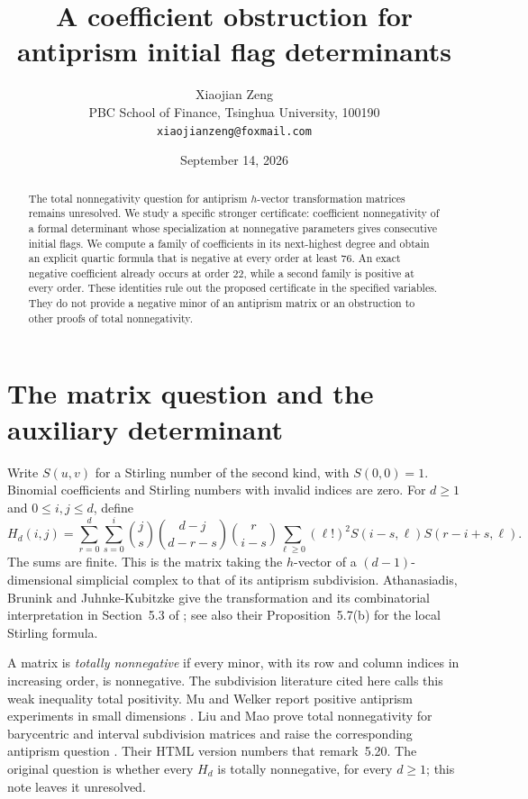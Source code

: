 \documentclass[11pt]{article}
\title{A coefficient obstruction for antiprism initial flag determinants}
\author{Xiaojian Zeng\\[3pt]
\small PBC School of Finance, Tsinghua University, 100190\\
\small\texttt{xiaojianzeng@foxmail.com}}
\date{September 14, 2026}
\begin{document}
\maketitle

\begin{abstract}
The total nonnegativity question for antiprism $h$-vector transformation
matrices remains unresolved. We study a specific stronger certificate:
coefficient nonnegativity of a formal determinant whose specialization at
nonnegative parameters gives consecutive initial flags. We compute a family of
coefficients in its next-highest degree and obtain an explicit quartic
formula that is negative at every order at least $76$. An exact negative
coefficient already occurs at order $22$, while a second family is positive
at every order. These identities rule out the proposed certificate in the
specified variables. They do not provide a negative minor of an antiprism
matrix or an obstruction to other proofs of total nonnegativity.
\end{abstract}

\section{The matrix question and the auxiliary determinant}

Write $S(u,v)$ for a Stirling number of the second kind, with $S(0,0)=1$.
Binomial coefficients and Stirling numbers with invalid indices are zero.
For $d\geq1$ and $0\leq i,j\leq d$, define
\begin{equation}\label{eq:H}
 H_d(i,j)=\sum_{r=0}^d\sum_{s=0}^i
 \binom{j}{s}\binom{d-j}{d-r-s}\binom{r}{i-s}
 \sum_{\ell\geq0}(\ell!)^2S(i-s,\ell)S(r-i+s,\ell).
\end{equation}
The sums are finite. This is the matrix taking the $h$-vector of a
$(d-1)$-dimensional simplicial complex to that of its antiprism subdivision.
Athanasiadis, Brunink and Juhnke-Kubitzke give the transformation and its
combinatorial interpretation in Section~5.3 of \cite{ABJ2022}; see also
their Proposition~5.7(b) for the local Stirling formula.

A matrix is \emph{totally nonnegative} if every minor, with its row and
column indices in increasing order, is nonnegative. The subdivision
literature cited here calls this weak inequality total positivity.
Mu and Welker report positive antiprism experiments in small dimensions
\cite[Section~2, final paragraph]{MW2026}.
Liu and Mao prove total nonnegativity for barycentric and interval
subdivision matrices and raise the corresponding antiprism question
\cite[Remark~5.8 in the PDF]{LM2026}. Their HTML version numbers that
remark~5.20. The original question is whether every $H_d$ is totally
nonnegative, for every $d\geq1$; this note leaves it unresolved.
\end{document}
